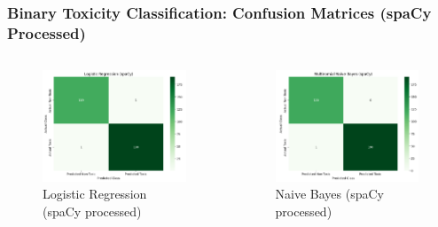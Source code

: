 \documentclass[aspectratio=169,xcolor=dvipsnames]{beamer}
\begin{document}
\begin{frame}
\frametitle{Binary Toxicity Classification: Confusion Matrices (spaCy Processed)}

\begin{columns}[c]
\begin{column}{0.5\textwidth}
\begin{figure}
\centering
\includegraphics[width=\linewidth]{figures/confusion_lr_spacy.png}
\caption{Logistic Regression (spaCy processed)}
\end{figure}
\end{column}

\begin{column}{0.5\textwidth}
\begin{figure}
\centering
\includegraphics[width=\linewidth]{figures/confusion_nb_spacy.png}
\caption{Naive Bayes (spaCy processed)}
\end{figure}
\end{column}
\end{columns}

\end{frame}
\end{document}
